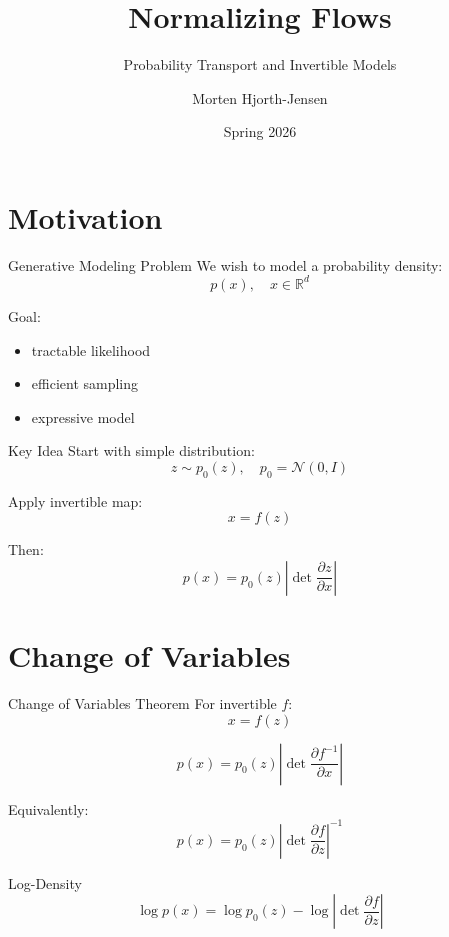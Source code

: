 \documentclass{beamer}
\title{Normalizing Flows}
\subtitle{Probability Transport and Invertible Models}
\author{Morten Hjorth-Jensen}
\date{Spring 2026}
\begin{document}
\frame{\titlepage}

\section{Motivation}

\begin{frame}{Generative Modeling Problem}
We wish to model a probability density:
\[
p(x), \quad x \in \mathbb{R}^d
\]

Goal:
\begin{itemize}
\item tractable likelihood
\item efficient sampling
\item expressive model
\end{itemize}
\end{frame}


\begin{frame}{Key Idea}
Start with simple distribution:
\[
z \sim p_0(z), \quad p_0 = \mathcal{N}(0,I)
\]

Apply invertible map:
\[
x = f(z)
\]

Then:
\[
p(x) = p_0(z) \left| \det \frac{\partial z}{\partial x} \right|
\]
\end{frame}

\section{Change of Variables}

\begin{frame}{Change of Variables Theorem}
For invertible $f$:
\[
x = f(z)
\]

\[
p(x) = p_0(z)\left|\det \frac{\partial f^{-1}}{\partial x}\right|
\]

Equivalently:
\[
p(x) = p_0(z)\left|\det \frac{\partial f}{\partial z}\right|^{-1}
\]
\end{frame}


\begin{frame}{Log-Density}
\[
\log p(x) = \log p_0(z) - \log \left| \det \frac{\partial f}{\partial z} \right|
\]
\end{frame}
\end{document}
